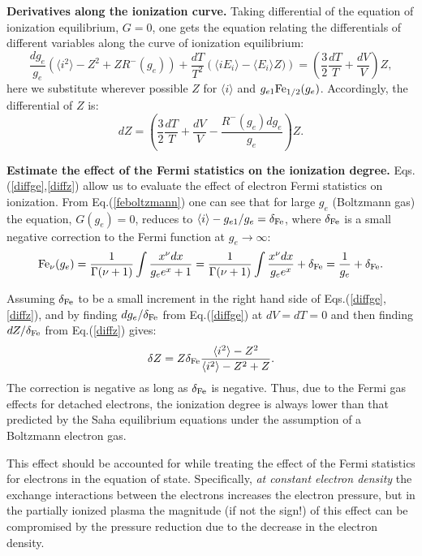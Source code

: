 {\bf Derivatives along the ionization curve.}
Taking differential of the equation of ionization equilibrium, $G=0$, one gets the equation relating the differentials
of different variables along the curve of ionization equilibrium:
\begin{equation}\label{diffge}
\frac{dg_e}
{g_e}
\left(
\langle i^2\rangle-Z^2+ZR^-(g_e)
\right)+\frac{dT}{T^2}
\left(\langle iE_i\rangle-\langle E_i\rangle Z)\right)=\left(\frac32\frac{dT}{T}+\frac{dV}V\right)Z,
\end{equation}
here we substitute wherever possible $Z$ for $\langle i\rangle$ and $g_{e1}{\rm Fe}_{1/2}(g_e)$.
Accordingly, the differential of $Z$ is:
\begin{equation}\label{diffz}
dZ=\left(\frac32\frac{dT}{T}+\frac{dV}V-\frac{R^-(g_e)dg_e}{g_e}\right)Z.
\end{equation}

{\bf Estimate the effect of the Fermi statistics on the ionization degree.}
Eqs.(\ref{diffge},\ref{diffz}) allow us to evaluate the effect of electron Fermi statistics on ionization.
From Eq.(\ref{feboltzmann}) one can
see that for large $g_e$ (Boltzmann gas) the equation, $G(g_e)=0$, reduces to $\langle i\rangle-g_{e1}/g_e=\delta_{\rm Fe}$,
where $\delta_{\rm Fe}$ is a small negative correction to the Fermi function at $g_e \to \infty$:
\begin{equation}\label{feboltzmann}
{\rm Fe}_\nu(g_e)=\frac{1}{\Gamma(\nu+1)} \int \frac{x^\nu dx}{g_e e^x + 1} =
\frac{1}{\Gamma(\nu+1)} \int \frac{x^\nu dx}{g_e e^x} + \delta_{\rm Fe} = \frac{1}{g_e} + \delta_{\rm Fe}.
\end{equation}

Assuming $\delta_{\rm Fe}$ to be a small increment in the right hand side of Eqs.(\ref{diffge},\ref{diffz}), and by
finding $dg_e/\delta_{\rm Fe}$ from Eq.(\ref{diffge}) at $dV=dT=0$ and then finding $dZ/\delta_{\rm Fe}$ from Eq.(\ref{diffz}) gives:
\begin{equation}
\delta Z=Z\delta_{\rm Fe}\frac{\langle i^2\rangle-Z^2}{\langle i^2\rangle-Z^2+Z}. 
\end{equation}
The correction is negative as long as $\delta_{\rm Fe}$ is negative. Thus, due to the Fermi gas effects for detached electrons, the ionization degree is
always lower than that predicted by the Saha equilibrium equations under the assumption of a Boltzmann electron gas.

This effect should be accounted for while
treating the effect of the Fermi statistics for electrons in the equation of state. Specifically, {\it at constant electron density} the exchange interactions 
between the electrons increases the electron pressure, but in the partially ionized plasma the magnitude (if not the sign!) of this effect can be  
compromised by the pressure reduction due to the decrease in the electron density. 

